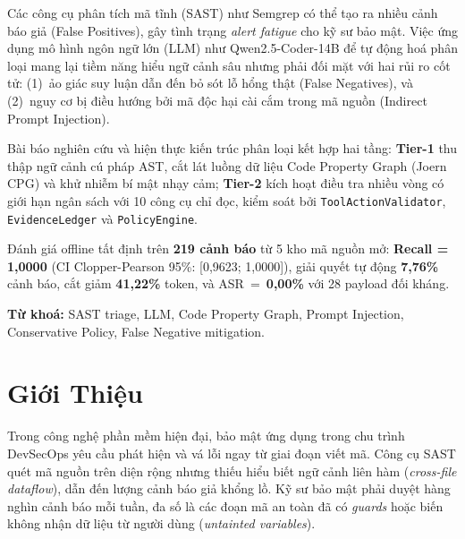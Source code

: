 \documentclass[12pt, a4paper]{article}
\begin{document}
\begin{tcolorbox}[
  enhanced, breakable,
  colback=blue!4, colframe=deepblue, arc=4pt,
  title={\bfseries TÓM TẮT},
  fonttitle=\color{white},
  attach boxed title to top left={yshift=-2mm, xshift=5mm},
  boxed title style={colback=deepblue},
  parbox=false
]
Các công cụ phân tích mã tĩnh (SAST) như Semgrep có thể tạo ra nhiều
cảnh báo giả (False Positives), gây tình trạng \emph{alert fatigue}
cho kỹ sư bảo mật. Việc ứng dụng mô hình ngôn ngữ lớn (LLM) như
Qwen2.5-Coder-14B để tự động hoá phân loại mang lại tiềm năng hiểu ngữ
cảnh sâu nhưng phải đối mặt với hai rủi ro cốt tử:
(1)~ảo giác suy luận dẫn đến bỏ sót lỗ hổng thật (False Negatives), và
(2)~nguy cơ bị điều hướng bởi mã độc hại cài cắm trong mã nguồn
(Indirect Prompt Injection).

Bài báo nghiên cứu và hiện thực kiến trúc phân loại kết hợp hai tầng:
\textbf{Tier-1} thu thập ngữ cảnh cú pháp AST, cắt lát luồng dữ liệu
Code Property Graph (Joern CPG) và khử nhiễm bí mật nhạy cảm;
\textbf{Tier-2} kích hoạt điều tra nhiều vòng có giới hạn ngân sách với
10 công cụ chỉ đọc, kiểm soát bởi \texttt{ToolActionValidator},
\texttt{EvidenceLedger} và \texttt{PolicyEngine}.

Đánh giá offline tất định trên \textbf{219 cảnh báo} từ 5 kho mã nguồn mở:
\textbf{Recall = 1,0000} (CI Clopper-Pearson 95\%: [0,9623; 1,0000]),
giải quyết tự động \textbf{7,76\%} cảnh báo, cắt giảm \textbf{41,22\%}
token, và ASR~=~\textbf{0,00\%} với 28 payload đối kháng.

\vspace{4pt}
\noindent\textbf{Từ khoá:} SAST triage, LLM, Code Property Graph, Prompt
Injection, Conservative Policy, False Negative mitigation.
\end{tcolorbox}

\vspace{1em}

\section{Giới Thiệu}

Trong công nghệ phần mềm hiện đại, bảo mật ứng dụng trong chu trình
DevSecOps yêu cầu phát hiện và vá lỗi ngay từ giai đoạn viết mã. Công
cụ SAST quét mã nguồn trên diện rộng nhưng thiếu hiểu biết ngữ cảnh
liên hàm (\emph{cross-file dataflow}), dẫn đến lượng cảnh báo giả khổng
lồ. Kỹ sư bảo mật phải duyệt hàng nghìn cảnh báo mỗi tuần, đa số là
các đoạn mã an toàn đã có \emph{guards} hoặc biến không nhận dữ liệu
từ người dùng (\emph{untainted variables}).
\end{document}
